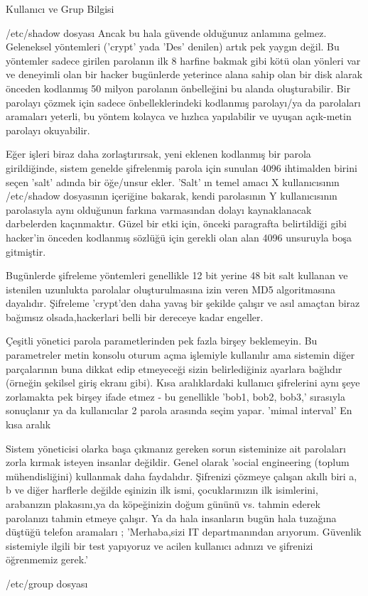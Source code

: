 \begin{section}{Kullanıcı ve Grup Bilgisi}
\begin{subsection}{/etc/shadow dosyası}
Ancak bu hala güvende olduğunuz anlamına gelmez. Geleneksel yöntemleri ('crypt' yada 'Des' denilen) artık pek yaygın değil. Bu yöntemler sadece girilen parolanın ilk 8 harfine bakmak gibi kötü olan yönleri var ve deneyimli olan bir hacker bugünlerde yeterince alana sahip olan bir disk alarak önceden kodlanmış 50 milyon parolanın önbelleğini bu alanda oluşturabilir. Bir parolayı çözmek için sadece önbelleklerindeki kodlanmış parolayı/ya da parolaları aramaları yeterli, bu yöntem kolayca ve hızlıca yapılabilir ve uyuşan açık-metin parolayı okuyabilir.

Eğer işleri biraz daha zorlaştırırsak, yeni eklenen kodlanmış bir parola girildiğinde, sistem genelde şifrelenmiş parola için sunulan 4096 ihtimalden birini seçen 'salt' adında bir öğe/unsur ekler. 'Salt' ın temel amacı X kullanıcısının /etc/shadow dosyasının içeriğine bakarak, kendi parolasının Y kullanıcısının parolasıyla aynı olduğunun farkına varmasından dolayı kaynaklanacak darbelerden kaçınmaktır. Güzel bir etki için, önceki paragrafta belirtildiği gibi hacker'in önceden kodlanmış sözlüğü için gerekli olan alan 4096 unsuruyla boşa gitmiştir.

Bugünlerde şifreleme yöntemleri genellikle 12 bit yerine 48 bit salt kullanan ve istenilen uzunlukta parolalar oluşturulmasına izin veren MD5 algoritmasına dayalıdır. Şifreleme 'crypt'den daha yavaş bir şekilde çalışır ve asıl amaçtan biraz bağımsız olsada,hackerlari belli bir dereceye kadar engeller.

Çeşitli yönetici parola parametlerinden pek fazla birşey beklemeyin. Bu parametreler metin konsolu oturum açma işlemiyle kullanılır ama sistemin diğer parçalarının buna dikkat edip etmeyeceği sizin belirlediğiniz ayarlara bağlıdır (örneğin şekilsel giriş ekranı gibi). Kısa aralıklardaki kullanıcı şifrelerini aynı şeye zorlamakta pek birşey ifade etmez - bu genellikle 'bob1, bob2, bob3,' sırasıyla sonuçlanır ya da kullanıcılar 2 parola arasında seçim yapar. 'mimal interval' En kısa aralık


Sistem yöneticisi olarka başa çıkmanız gereken sorun sisteminize ait parolaları zorla kırmak isteyen insanlar değildir. Genel olarak 'social engineering (toplum mühendisliğini) kullanmak daha faydalıdır. Şifrenizi çözmeye çalışan akıllı biri a, b ve diğer harflerle değilde eşinizin ilk ismi, çocuklarınızın ilk isimlerini, arabanızın plakasını,ya da köpeğinizin doğum gününü vs. tahmin ederek parolanızı tahmin etmeye çalışır. Ya da hala insanların bugün hala tuzağına düştüğü telefon aramaları ; 'Merhaba,sizi IT departmanından arıyorum. Güvenlik sistemiyle ilgili bir test yapıyoruz ve acilen kullanıcı adınızı ve şifrenizi öğrenmemiz gerek.'
\end{subsection}
\begin{subsection}{/etc/group dosyası}


\end{subsection}
\end{section}
